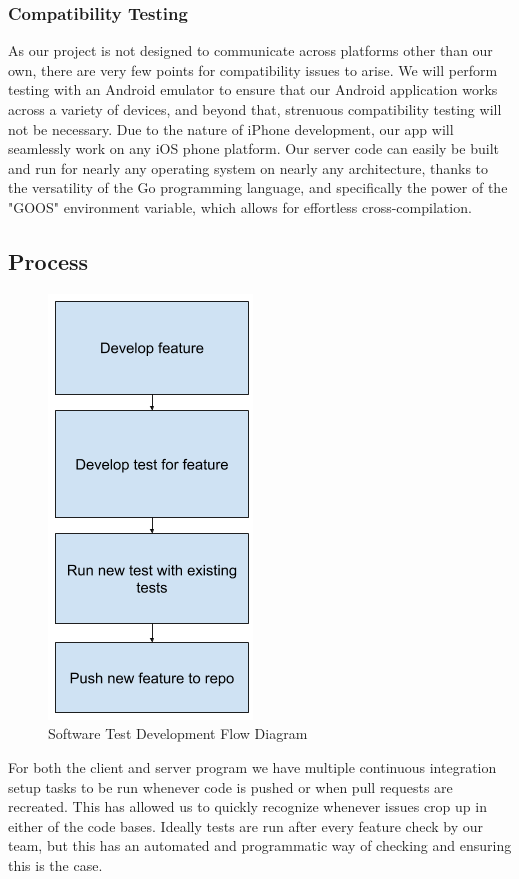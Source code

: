 \documentclass[11pt]{article}
\begin{document}
\subsubsection*{Compatibility Testing}
As our project is not designed to communicate across platforms other than our own, there are very few points for compatibility issues to arise. We will perform testing with an Android emulator to ensure that our Android application works across a variety of devices, and beyond that, strenuous compatibility testing will not be necessary. Due to the nature of iPhone development, our app will seamlessly work on any iOS phone platform. Our server code can easily be built and run for nearly any operating system on nearly any architecture, thanks to the versatility of the Go programming language, and specifically the power of the "GOOS" environment variable, which allows for effortless cross-compilation.

\subsection{Process}

\begin{figure}[h!]
  \centerline{\includegraphics{testFlowchart.png}}
  \caption{Software Test Development Flow Diagram}
  \label{fig:flow_diag}
\end{figure}

For both the client and server program we have multiple continuous integration setup tasks to be run whenever code is pushed or when pull requests are recreated. This has allowed us to quickly recognize whenever issues crop up in either of the code bases.  Ideally tests are run after every feature check by our team, but this has an automated and programmatic way of checking and ensuring this is the case.
\end{document}
